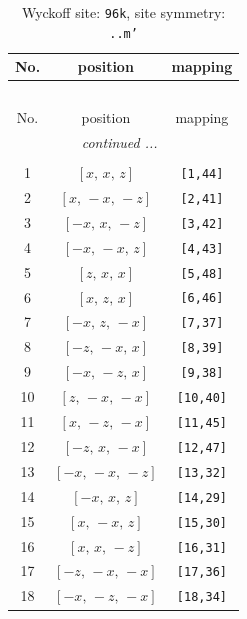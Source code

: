 \documentclass[fleqn,8pt]{jsarticle}
\begin{document}
\begin{longtable}{ccc}
\caption{Wyckoff site: {\tt 96k}, site symmetry: {\tt ..m'}}
 \\
 \hline \hline
No. & position & mapping \\ \hline \endfirsthead

\multicolumn{2}{l}{\tablename\ \thetable{}} \\
 \hline \hline
No. & position & mapping \\ \hline \endhead

 \hline \hline
\multicolumn{2}{r}{\footnotesize\it continued ...} \\ \endfoot

 \hline \hline
\multicolumn{2}{r}{} \\ \endlastfoot

1 & $\left[ x,\, x,\, z \right]$ & {\tt [1,44]} \\ \hline
2 & $\left[ x,\, - x,\, - z \right]$ & {\tt [2,41]} \\ \hline
3 & $\left[ - x,\, x,\, - z \right]$ & {\tt [3,42]} \\ \hline
4 & $\left[ - x,\, - x,\, z \right]$ & {\tt [4,43]} \\ \hline
5 & $\left[ z,\, x,\, x \right]$ & {\tt [5,48]} \\ \hline
6 & $\left[ x,\, z,\, x \right]$ & {\tt [6,46]} \\ \hline
7 & $\left[ - x,\, z,\, - x \right]$ & {\tt [7,37]} \\ \hline
8 & $\left[ - z,\, - x,\, x \right]$ & {\tt [8,39]} \\ \hline
9 & $\left[ - x,\, - z,\, x \right]$ & {\tt [9,38]} \\ \hline
10 & $\left[ z,\, - x,\, - x \right]$ & {\tt [10,40]} \\ \hline
11 & $\left[ x,\, - z,\, - x \right]$ & {\tt [11,45]} \\ \hline
12 & $\left[ - z,\, x,\, - x \right]$ & {\tt [12,47]} \\ \hline
13 & $\left[ - x,\, - x,\, - z \right]$ & {\tt [13,32]} \\ \hline
14 & $\left[ - x,\, x,\, z \right]$ & {\tt [14,29]} \\ \hline
15 & $\left[ x,\, - x,\, z \right]$ & {\tt [15,30]} \\ \hline
16 & $\left[ x,\, x,\, - z \right]$ & {\tt [16,31]} \\ \hline
17 & $\left[ - z,\, - x,\, - x \right]$ & {\tt [17,36]} \\ \hline
18 & $\left[ - x,\, - z,\, - x \right]$ & {\tt [18,34]} \\ \hline

\end{longtable}
\end{document}
